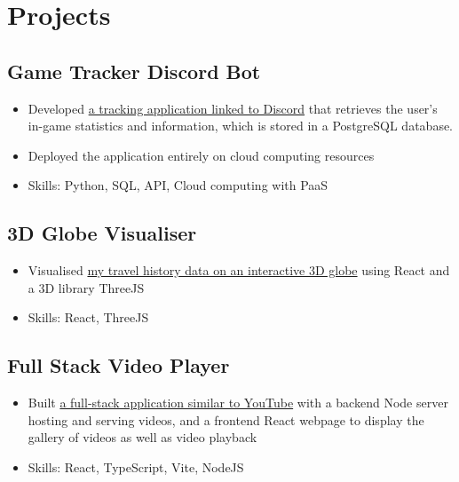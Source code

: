 \documentclass{cv}
\begin{document}
\section{Projects}
\begin{subsections}
    \item\subsection{Game Tracker Discord Bot}
    \begin{itemize}
        \item Developed \href{https://thedylone.github.io/laffey-bot/}{a tracking application linked to Discord} that retrieves the user's in-game statistics and information, which is stored in a PostgreSQL database.
        \item Deployed the application entirely on cloud computing resources
        \item Skills: Python, SQL, API, Cloud computing with PaaS
    \end{itemize}

    \item\subsection{3D Globe Visualiser}
    \begin{itemize}
        \item Visualised \href{https://thedylone.github.io/travel-history/}{my travel history data on an interactive 3D globe} using React and a 3D library ThreeJS
        \item Skills: React, ThreeJS
    \end{itemize}

    \item\subsection{Full Stack Video Player}
    \begin{itemize}
        \item Built \href{https://github.com/thedylone/node-video-player}{a full-stack application similar to YouTube} with a backend Node server hosting and serving videos, and a frontend React webpage to display the gallery of videos as well as video playback 
        \item Skills: React, TypeScript, Vite, NodeJS
    \end{itemize}


\end{subsections}
\end{document}
